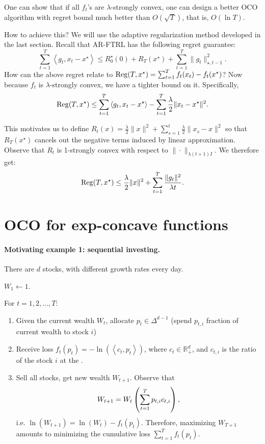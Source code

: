 \documentclass{article}
\DeclareMathOperator*{\Reg}{{\rm Reg}}
\newcommand{\RR}{\mathbb{R}} %
\newcommand{\inner}[2]{\left\langle #1,#2 \right\rangle}
\begin{document}
One can show that if all $f_t$'s are $\lambda$-strongly convex, one can design a better OCO algorithm with regret bound much better than $O(\sqrt{T})$, that is, $O(\ln T)$.

How to achieve this? We will use the adaptive regularization method developed in the last section. Recall that AR-FTRL has the following regret guarantee:
\[ \sum_{t=1}^T \inner{g_t}{x_t - x^\star} \leq R_0^\star(0) + R_T(x^\star) + \sum_{t=1}^T \| g_t \|_{\star, t-1}^2. \]
How can the above regret relate to $\Reg(T, x^\star) = \sum_{t=1}^T f_t(x_t) - f_t(x^\star)$? Now because $f_t$ is $\lambda$-strongly convex, we have a tighter bound on it. Specifically,
\[ \Reg(T, x^\star) \leq \sum_{t=1}^T \inner{g_t}{x_t -x^\star} - \sum_{t=1}^T \frac\lambda 2\| x_t - x^\star \|^2. \]

This motivates us to define $R_t(x) = \frac\lambda 2\| x \|^2 + \sum_{s=1}^t \frac\lambda 2\| x_s - x \|^2$ so that $R_T(x^\star)$ cancels out the negative terms induced by linear approximation.
Observe that $R_t$ is 1-strongly convex with respect to $\| \cdot \|_{\lambda(t+1) I}$.
We therefore get:
\[ \Reg(T, x^\star) \leq \frac{\lambda}{2}\|x\|^2 + \sum_{t=1}^T \frac{\| g_t \|^2}{\lambda t}. \]


\section{OCO for exp-concave functions}

\paragraph{Motivating example 1: sequential investing.} There are $d$ stocks, with different growth rates every day.

$W_1 \gets 1$.

For $t = 1,2,\ldots,T$:
\begin{enumerate}
\item Given the current wealth $W_t$, allocate $p_t \in \Delta^{d-1}$ (spend $p_{t,i}$ fraction of current wealth to stock $i$)
\item Receive loss $f_t(p_t) = -\ln(\inner{c_t}{p_t})$, where $c_t \in \RR^d_+$, and $c_{t,i}$ is the ratio of the stock $i$ at the .
\item Sell all stocks, get new wealth $W_{t+1}$. Observe that
\[ W_{t+1} = W_t \del{\sum_{t=1}^T p_{t,i} c_{t,i}}, \]
i.e. $\ln(W_{t+1}) = \ln(W_t) - f_t(p_t)$. Therefore, maximizing $W_{T+1}$ amounts to minimizing the cumulative loss $\sum_{t=1}^T f_t(p_t)$.
\end{enumerate}
\end{document}
